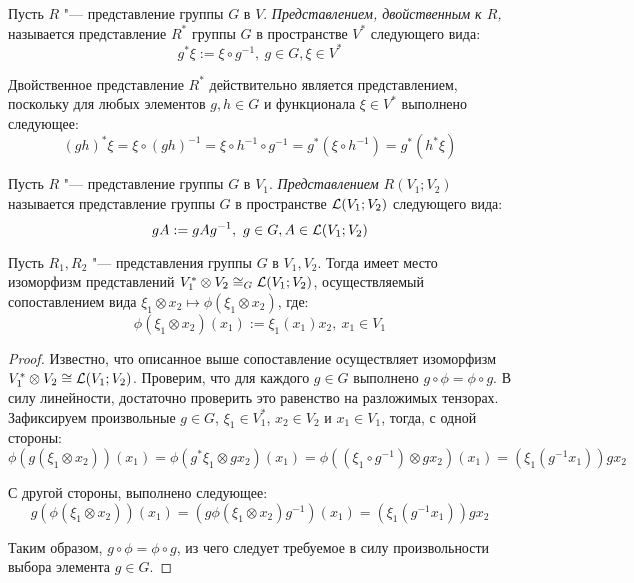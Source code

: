 \begin{definition}
	Пусть $R$ "--- представление группы $G$ в $V$. \textit{Представлением, двойственным к $R$,} называется представление $R^*$ группы $G$ в пространстве $V^*$ следующего вида:
	\[g^*\xi := \xi\circ g^{-1},~g \in G, \xi \in V^*\]
\end{definition}

\begin{note}
	Двойственное представление $R^*$ действительно является представлением, поскольку для любых элементов $g, h \in G$ и функционала $\xi \in V^*$ выполнено следующее:
	\[(gh)^*\xi = \xi \circ (gh)^{-1} = \xi \circ h^{-1} \circ g^{-1} = g^*(\xi \circ h^{-1})= g^*(h^*\xi)\]
\end{note}

\begin{definition}
	Пусть $R$ "--- представление группы $G$ в $V_1$. \textit{Представлением $R(V_1; V_2)$} называется представление группы $G$ в пространстве $\mathcal L(V_1; V_2)$ следующего вида:
	\[gA := gAg^{-1},~g \in G, A \in \mathcal L(V_1; V_2)\]
\end{definition}

\begin{proposition}
	Пусть $R_1, R_2$ "--- представления группы $G$ в $V_1, V_2$. Тогда имеет место изоморфизм представлений $V_1^* \otimes V_2 \cong_G \mathcal L(V_1; V_2)$, осуществляемый сопоставлением вида $\xi_1 \otimes x_2 \mapsto \phi(\xi_1 \otimes x_2)$, где:
	\[\phi(\xi_1 \otimes x_2)(x_1) := \xi_1(x_1)x_2,~x_1 \in V_1\]
\end{proposition}

\begin{proof}
	Известно, что описанное выше сопоставление осуществляет изоморфизм $V_1^* \otimes V_2 \cong \mathcal L(V_1; V_2)$. Проверим, что для каждого $g \in G$ выполнено $g \circ \phi = \phi \circ g$. В силу линейности, достаточно проверить это равенство на разложимых тензорах. Зафиксируем произвольные $g \in G$, $\xi_1 \in V_1^*$, $x_2 \in V_2$ и $x_1 \in V_1$, тогда, с одной стороны:
	\[\phi(g(\xi_1 \otimes x_2))(x_1) = \phi(g^*\xi_1 \otimes gx_2)(x_1) = \phi((\xi_1 \circ g^{-1}) \otimes gx_2)(x_1) = (\xi_1(g^{-1}x_1))gx_2\]
	
	С другой стороны, выполнено следующее:
	\[g(\phi(\xi_1 \otimes x_2))(x_1) = (g\phi(\xi_1 \otimes x_2)g^{-1})(x_1) = (\xi_1(g^{-1}x_1))gx_2\]
	
	Таким образом, $g \circ \phi = \phi \circ g$, из чего следует требуемое в силу произвольности выбора элемента $g \in G$.
\end{proof}

